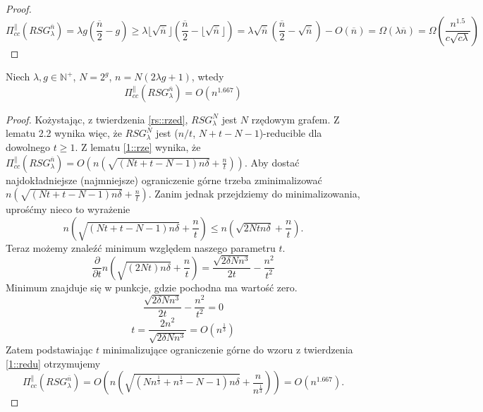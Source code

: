 \begin{proof}
	$$ \Pi_{cc}^{ \parallel }(RSG_{\lambda}^{\overline{n}}) = \lambda g \left( \frac{ \overline{n}}{2} - g \right) \geq \lambda \lfloor \sqrt{ \overline{n}} \rfloor \left( \frac{ \overline{n}}{2} - \lfloor \sqrt{ \overline{n}} \rfloor \right) = \lambda \sqrt{ \overline{n}} \left( \frac{ \overline{n}}{2} - \sqrt{ \overline{n}} \right) - O(\overline{n}) =  \Omega \left( \lambda \overline{n} \right) = \Omega \left( \frac{n^{1.5}}{c \sqrt{c \lambda}} \right) $$
	
\end{proof}



\begin{theorem}
	Niech $\lambda, g \in \mathbb{N}^{+}$, $N = 2^{g}$, $n = N(2 \lambda g + 1)$, wtedy
	$$ \Pi_{cc}^{ \parallel }(RSG_{\lambda}^{\overline{n}}) = O \left( n^{1.667} \right) $$
\end{theorem}

\begin{proof}
	Kożystając, z twierdzenia \ref{rs::rzed}, $RSG_{\lambda}^{N}$ jest $N$ rzędowym grafem.
	Z lematu 2.2 wynika więc, że $RSG_{\lambda}^{N}$  jest ($n / t$, $N + t - N - 1$)-reducible dla dowolnego $t \geq 1$.
	Z lematu \ref{1::rze} wynika, że $\Pi_{cc}^{ \parallel }(RSG_{\lambda}^{\overline{n}}) = O \left( n \left( \sqrt{( N t + t - N - 1)n \delta } + \frac{n}{t} \right) \right)$.
	Aby dostać najdokładniejsze (najmniejsze) ograniczenie górne trzeba zminimalizować
	$n \left( \sqrt{( N t + t - N - 1)n \delta } + \frac{n}{t} \right)$.
	Zanim jednak przejdziemy do minimalizowania, uprośćmy nieco to wyrażenie
	$$ n \left( \sqrt{( N t + t - N - 1)n \delta } + \frac{n}{t} \right) \leq n \left( \sqrt{ 2N t n \delta } + \frac{n}{t} \right) .$$
	Teraz możemy znaleźć minimum względem naszego parametru $t$.
	$$ \frac{\partial}{\partial t} n \left( \sqrt{( 2N t)n \delta } + \frac{n}{t} \right) = \frac{ \sqrt{ 2 \delta N n^{3} }}{2t} - \frac{n^{2}}{t^{2}}$$
	Minimum znajduje się w punkcje, gdzie pochodna ma wartość zero.
	$$ \frac{ \sqrt{ 2 \delta N n^{3} }}{2t} - \frac{n^{2}}{t^{2}} = 0$$
	$$ t = \frac{2n^{2}}{ \sqrt{ 2 \delta N n^{3} }} = O \left( n^{\frac{1}{3}} \right) $$
	Zatem podstawiając $t$ minimalizujące ograniczenie górne do wzoru z twierdzenia \ref{1::redu} otrzymujemy
	$$ \Pi_{cc}^{ \parallel }(RSG_{\lambda}^{\overline{n}}) = O \left( n \left( \sqrt{( N n^{\frac{1}{3}} + n^{\frac{1}{3}} - N - 1)n \delta } + \frac{n}{n^{\frac{1}{3}}} \right) \right) = O \left( n^{1.667} \right). $$
\end{proof}

